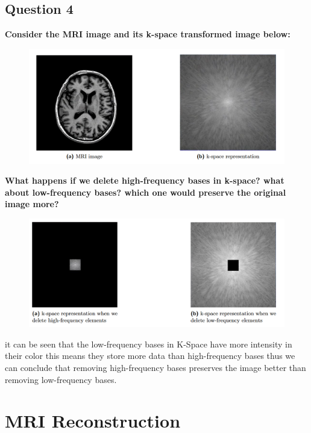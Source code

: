 \documentclass[11pt]{article}
\begin{document}
\subsection{Question 4}
\textbf{Consider the MRI image and its k-space transformed image below:} \\
\begin{figure}[H]
    \begin{center}
        \includegraphics[scale=0.5]{Fig/Q1-4.png}
    \end{center}
\end{figure}
\textbf{What happens if we delete high-frequency bases in k-space? what about low-frequency
bases? which one would preserve the original image more?} \\
\begin{figure}[H]
    \begin{center}
        \includegraphics[scale=0.5]{Fig/Q1-4-1.png}
    \end{center}
\end{figure}
it can be seen that the low-frequency bases in K-Space have more intensity in their color
this means they store more data than high-frequency bases thus we can conclude that removing
high-frequency bases preserves the image better than removing low-frequency bases. 

\section{MRI Reconstruction}
\end{document}

